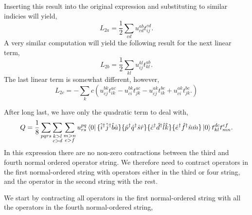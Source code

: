 Inserting this result into the original expression and substituting to similar indicies
will yield,
\begin{equation}
    L_{2a} = \frac{1}{2} \sum_{cd} u^{ab}_{cd} t^{cd}_{ij}.
\end{equation}
A very similar computation will yield the following result for the next linear term,
\begin{equation}
    L_{2b} = \frac{1}{2} \sum_{kl} u^{kl}_{ij} t^{ab}_{kl}.
\end{equation}
The last linear term is somewhat different, however,
\begin{equation}
    L_{2c} = - \sum_kc \left( 
         u^{bk}_{cj} t^{ac}_{ik}
       - u^{bk}_{ci} t^{ac}_{jk} 
       - u^{ak}_{cj} t^{bc}_{ik}
       + u^{ak}_{ci} t^{bc}_{jk}. 
    \right)
\end{equation}

After long last, we have only the quadratic term to deal with,
\begin{equation}
    Q = \frac{1}{8}\sum_{pqrs}\sum_{\substack{k>l \\ c>d}} \sum_{\substack{m>n \\ e>f}}
        u^{pq}_{rs} \bra{0}
            \{\hat{i}^\dagger \hat{j}^\dagger \hat{b} \hat{a} \}
            \{\hat{p}^\dagger \hat{q}^\dagger \hat{s} \hat{r} \}
            \{\hat{c}^\dagger \hat{d}^\dagger \hat{l} \hat{k} \}
            \{\hat{e}^\dagger \hat{f}^\dagger \hat{n} \hat{m} \}
        \ket{0} t^{dc}_{kl} t^{ef}_{mn}.
\end{equation}
In this expression there are no non-zero contractions between the third and 
fourth normal ordered operator string. We therefore need to contract operators 
in the first normal-ordered string with operators either in the third or four 
string, and the operator in the second string with the rest. 

We start by contracting all operators in the first normal-ordered string 
with all the operators in the fourth normal-ordered string,

